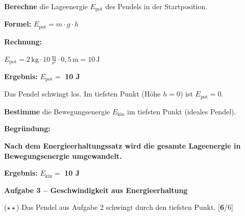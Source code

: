 \documentclass[11pt, a4paper]{article}
\newcommand{\lsg}[1]{\textcolor{loesung}{\textbf{#1}}}
\newcommand{\punktebox}[1]{\hfill\small\textcolor{mittelgrau}{[\lsg{#1}/#1]}}
\newcommand{\aufgabe}[1]{%
    \needspace{4\baselineskip}%
    \vspace{10pt}%
    \noindent\textbf{\textcolor{fachfarbe}{Aufgabe #1}}%
    \vspace{4pt}%
    \nopagebreak[4]%
}
\newcommand{\operator}[1]{\textbf{\textcolor{fachfarbe}{#1}}}
\begin{document}
\begin{teil}
\item \operator{Berechne} die Lageenergie $E_\text{pot}$ des Pendels in der Startposition.

\vspace{4pt}
\textbf{Formel:} $E_\text{pot} = m \cdot g \cdot h$

\vspace{6pt}
\textbf{Rechnung:}

\lsg{$E_\text{pot} = 2\,\text{kg} \cdot 10\,\frac{\text{m}}{\text{s}^2} \cdot 0{,}5\,\text{m} = 10\,\text{J}$}

\textbf{Ergebnis:} $E_\text{pot} = $ \lsg{10 J}

\vspace{4pt}

\item Das Pendel schwingt los. Im tiefsten Punkt (Höhe $h = 0$) ist $E_\text{pot} = 0$.

\operator{Bestimme} die Bewegungsenergie $E_\text{kin}$ im tiefsten Punkt (ideales Pendel).

\vspace{6pt}
\textbf{Begründung:}

\lsg{Nach dem Energieerhaltungssatz wird die gesamte Lageenergie in Bewegungsenergie umgewandelt.}

\textbf{Ergebnis:} $E_\text{kin} = $ \lsg{10 J}
\end{teil}

\vspace{0.5em}

\aufgabe{3 – Geschwindigkeit aus Energieerhaltung}

($\star\star$) Das Pendel aus Aufgabe 2 schwingt durch den tiefsten Punkt. \punktebox{6}
\end{document}
